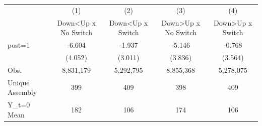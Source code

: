 {
\def\sym#1{\ifmmode^{#1}\else\(^{#1}\)\fi}
\begin{tabular}{l*{4}{c}}
\hline\hline
                    &\multicolumn{1}{c}{(1)}&\multicolumn{1}{c}{(2)}&\multicolumn{1}{c}{(3)}&\multicolumn{1}{c}{(4)}\\
                    &\multicolumn{1}{c}{Down<Up x No Switch}&\multicolumn{1}{c}{Down<Up x Switch}&\multicolumn{1}{c}{Down>Up x No Switch}&\multicolumn{1}{c}{Down>Up x Switch}\\
\hline
post=1              &      -6.604         &      -1.937         &      -5.146         &      -0.768         \\
                    &     (4.052)         &     (3.011)         &     (3.836)         &     (3.564)         \\
\hline
Obs.                &   8,831,179         &   5,292,795         &   8,855,368         &   5,278,075         \\
Unique Assembly     &         399         &         409         &         398         &         409         \\
Y\_t=0 Mean          &         182         &         106         &         174         &         106         \\
\hline\hline
\end{tabular}
}

